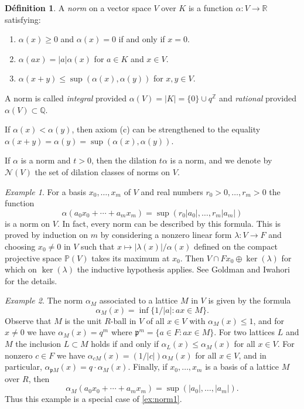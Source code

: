 \documentclass[12pt,a4paper]{article}
\theoremstyle{plain}
\theoremstyle{definition}
\newtheorem{definition}{D\'efinition}[section]
\theoremstyle{remark}
\newtheorem{example}{Example}[section]
\newcommand{\fp}{\mathfrak{p}}
\newcommand{\bQ}{\mathbb{Q}}
\newcommand{\bZ}{\mathbb{Z}}
\newcommand{\bP}{\mathbb{P}}
\newcommand{\bR}{\mathbb{R}}
\newcommand{\cN}{\mathcal{N}}
\providecommand{\cN}{\mathcal{N}}
\providecommand{\fp}{\mathfrak{p}}
\begin{document}
\begin{definition}
\label{def:norm}
A \emph{norm} on a vector space $V$ over $K$ is a function $\alpha: V \to \bR$ satisfying:
\begin{enumerate}[label=(\alph*)]
\item $\alpha(x) \geq 0$ and $\alpha(x) = 0$ if and only if $x = 0$.
\item $\alpha(ax) = |a| \alpha(x)$ for $a \in K$ and $x \in V$.
\item $\alpha(x+y) \leq \sup(\alpha(x), \alpha(y))$ for $x, y \in V$.
\end{enumerate}
A norm is called \emph{integral} provided $\alpha(V) = |K| = \{0\} \cup q^{\bZ}$ and \emph{rational} provided $\alpha(V) \subset \bQ$.
\end{definition}

If $\alpha(x) < \alpha(y)$, then axiom (c) can be strengthened to the equality $\alpha(x+y) = \alpha(y) = \sup(\alpha(x), \alpha(y))$.

If $\alpha$ is a norm and $t > 0$, then the dilation $t\alpha$ is a norm, and we denote by $\cN(V)$ the set of dilation classes of norms on $V$.

\begin{example}
\label{ex:norm1}
For a basis $x_0, \ldots, x_m$ of $V$ and real numbers $r_0 > 0, \ldots, r_m > 0$ the function
\[
\alpha(a_0 x_0 + \cdots + a_m x_m) = \sup(r_0 |a_0|, \ldots, r_m |a_m|)
\]
is a norm on $V$. In fact, every norm can be described by this formula. This is proved by induction on $m$ by considering a nonzero linear form $\lambda: V \to F$ and choosing $x_0 \neq 0$ in $V$ such that $x \mapsto |\lambda(x)|/\alpha(x)$ defined on the compact projective space $\bP(V)$ takes its maximum at $x_0$. Then $V \cap Fx_0 \oplus \ker(\lambda)$ for which on $\ker(\lambda)$ the inductive hypothesis applies. See Goldman and Iwahori for the details.
\end{example}

\begin{example}
\label{ex:norm2}
The norm $\alpha_M$ associated to a lattice $M$ in $V$ is given by the formula
\[
\alpha_M(x) = \inf\{1/|a| : ax \in M\}.
\]
Observe that $M$ is the unit $R$-ball in $V$ of all $x \in V$ with $\alpha_M(x) \leq 1$, and for $x \neq 0$ we have $\alpha_M(x) = q^m$ where $\fp^m = \{a \in F : ax \in M\}$. For two lattices $L$ and $M$ the inclusion $L \subset M$ holds if and only if $\alpha_L(x) \leq \alpha_M(x)$ for all $x \in V$. For nonzero $c \in F$ we have $\alpha_{cM}(x) = (1/|c|)\alpha_M(x)$ for all $x \in V$, and in particular, $\alpha_{\fp M}(x) = q \cdot \alpha_M(x)$. Finally, if $x_0, \ldots, x_m$ is a basis of a lattice $M$ over $R$, then
\[
\alpha_M(a_0 x_0 + \cdots + a_m x_m) = \sup(|a_0|, \ldots, |a_m|).
\]
Thus this example is a special case of \eqref{ex:norm1}.
\end{example}
\end{document}
